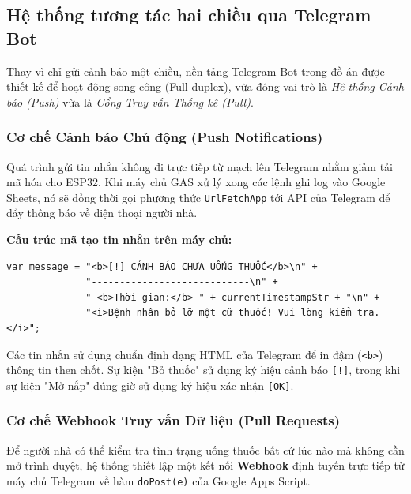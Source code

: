 \documentclass[12pt, a4paper, oneside]{article}
\begin{document}
\subsection{Hệ thống tương tác hai chiều qua Telegram Bot}

Thay vì chỉ gửi cảnh báo một chiều, nền tảng Telegram Bot trong đồ án được thiết kế để hoạt động song công (Full-duplex), vừa đóng vai trò là \textit{Hệ thống Cảnh báo (Push)} vừa là \textit{Cổng Truy vấn Thống kê (Pull)}.

\subsubsection{Cơ chế Cảnh báo Chủ động (Push Notifications)}
Quá trình gửi tin nhắn không đi trực tiếp từ mạch lên Telegram nhằm giảm tải mã hóa cho ESP32. Khi máy chủ GAS xử lý xong các lệnh ghi log vào Google Sheets, nó sẽ đồng thời gọi phương thức \texttt{UrlFetchApp} tới API của Telegram để đẩy thông báo về điện thoại người nhà.

\textbf{Cấu trúc mã tạo tin nhắn trên máy chủ:}
\begin{verbatim}
var message = "<b>[!] CẢNH BÁO CHƯA UỐNG THUỐC</b>\n" +
              "----------------------------\n" +
              " <b>Thời gian:</b> " + currentTimestampStr + "\n" +
              "<i>Bệnh nhân bỏ lỡ một cữ thuốc! Vui lòng kiểm tra.</i>";
\end{verbatim}
Các tin nhắn sử dụng chuẩn định dạng HTML của Telegram để in đậm (\texttt{<b>}) thông tin then chốt. Sự kiện "Bỏ thuốc" sử dụng ký hiệu cảnh báo \texttt{[!]}, trong khi sự kiện "Mở nắp" đúng giờ sử dụng ký hiệu xác nhận \texttt{[OK]}.

\subsubsection{Cơ chế Webhook Truy vấn Dữ liệu (Pull Requests)}
Để người nhà có thể kiểm tra tình trạng uống thuốc bất cứ lúc nào mà không cần mở trình duyệt, hệ thống thiết lập một kết nối \textbf{Webhook} định tuyến trực tiếp từ máy chủ Telegram về hàm \texttt{doPost(e)} của Google Apps Script.
\end{document}
